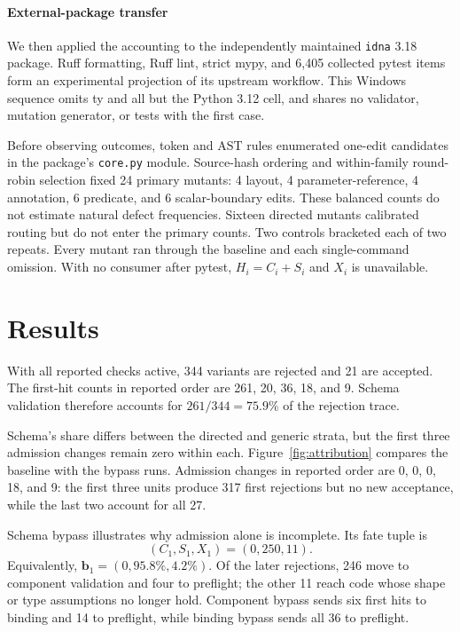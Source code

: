 \documentclass[11pt]{article}
\begin{document}
\paragraph{External-package transfer}
We then applied the accounting to the independently maintained \texttt{idna}
3.18 package. Ruff formatting, Ruff lint, strict mypy, and 6,405 collected
pytest items form an experimental projection of its upstream workflow. This
Windows sequence omits ty and all but the Python 3.12 cell, and shares no
validator, mutation generator, or tests with the first case.

Before observing outcomes, token and AST rules enumerated one-edit candidates
in the package's \texttt{core.py} module. Source-hash ordering and within-family round-robin
selection fixed 24 primary mutants: 4 layout, 4 parameter-reference, 4
annotation, 6 predicate, and 6 scalar-boundary edits. These balanced counts do
not estimate natural defect frequencies. Sixteen directed mutants calibrated
routing but do not enter the primary counts. Two controls bracketed each of two
repeats. Every mutant ran through the baseline and each single-command omission.
With no consumer after pytest, $H_i=C_i+S_i$ and $X_i$ is unavailable.

\section{Results}
\label{sec:results}

With all reported checks active, 344 variants are rejected and 21 are accepted.
The first-hit counts in reported order are 261, 20, 36, 18, and 9. Schema validation
therefore accounts for $261/344=75.9\%$ of the rejection trace.

Schema's share differs between the directed and generic strata, but the first
three admission changes remain zero within each. Figure~\ref{fig:attribution}
compares the baseline with the bypass runs. Admission changes in reported order
are 0, 0, 0, 18, and 9: the first three units produce 317 first rejections but
no new acceptance, while the last two account for all 27.

Schema bypass illustrates why admission alone is incomplete. Its fate tuple is
\begin{equation}
  (C_1,S_1,X_1)=(0,250,11).
\end{equation}
Equivalently, $\mathbf{b}_1=(0,95.8\%,4.2\%)$. Of the later rejections, 246 move
to component validation and four to preflight; the other 11 reach code whose
shape or type assumptions no longer hold. Component bypass sends six first hits
to binding and 14 to preflight, while binding bypass sends all 36 to preflight.
\end{document}
